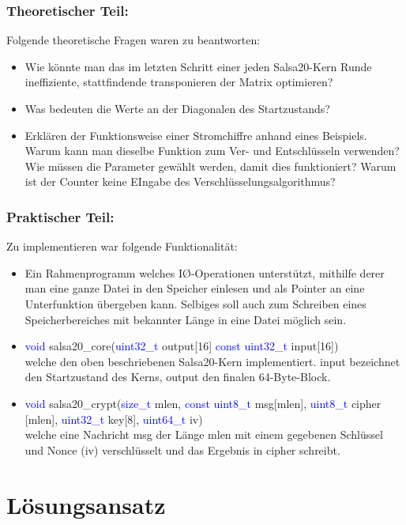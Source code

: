 \documentclass[course=erap]{aspdoc}
\begin{document}
\subsubsection{Theoretischer Teil:}
Folgende theoretische Fragen waren zu beantworten:
\begin{itemize}
    \item Wie könnte man das im letzten Schritt einer jeden Salsa20-Kern Runde ineffiziente, stattfindende transponieren der Matrix optimieren?
    \item Was bedeuten die Werte an der Diagonalen des Startzustands?
    \item Erklären der Funktionsweise einer Stromchiffre anhand eines Beispiels. Warum kann man dieselbe Funktion zum Ver- und Entschlüsseln verwenden? Wie müssen die Parameter gewählt werden, damit dies funktioniert? Warum ist der Counter keine EIngabe des Verschlüsselungsalgorithmus?
\end{itemize}
\subsubsection{Praktischer Teil:}
Zu implementieren  war folgende Funktionalität: 
\begin{itemize}
    \item Ein Rahmenprogramm welches I\O-Operationen unterstützt, mithilfe derer man eine ganze Datei in den Speicher einlesen und als Pointer an eine Unterfunktion übergeben kann. Selbiges soll auch zum Schreiben eines Speicherbereiches mit bekannter Länge in eine Datei möglich sein.
    \item \textcolor{blue}{void} salsa20\_core(\textcolor{blue} {uint32\_t} output[16] \textcolor{blue}{const uint32\_t} input[16]) \\
    welche den oben beschriebenen Salsa20-Kern implementiert. input bezeichnet den Startzustand des Kerns, output den finalen 64-Byte-Block. \\
    \item \textcolor{blue} {void} salsa20\_crypt(\textcolor{blue}{size\_t} mlen, \textcolor {blue} {const uint8\_t} msg[mlen], \textcolor{blue}{uint8\_t} cipher [mlen], \textcolor{blue}{uint32\_t} key[8], \textcolor {blue} {uint64\_t} iv) \\
    welche eine Nachricht msg der Länge mlen mit einem gegebenen Schlüssel und Nonce (iv) verschlüsselt und das Ergebnis in cipher schreibt.
\end{itemize}


\section{Lösungsansatz}
\end{document}
